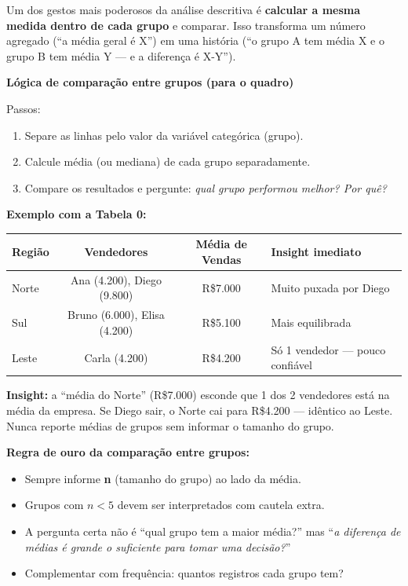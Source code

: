 Um dos gestos mais poderosos da análise descritiva é \textbf{calcular a mesma
medida dentro de cada grupo} e comparar. Isso transforma um número agregado
(``a média geral é X'') em uma história (``o grupo A tem média X e o grupo B
tem média Y — e a diferença é X-Y'').

\begin{BoardBox}
\textbf{Lógica de comparação entre grupos (para o quadro)}

Passos:
\begin{enumerate}
  \item Separe as linhas pelo valor da variável categórica (grupo).
  \item Calcule média (ou mediana) de cada grupo separadamente.
  \item Compare os resultados e pergunte: \emph{qual grupo performou melhor? Por quê?}
\end{enumerate}

\textbf{Exemplo com a Tabela 0:}
\begin{center}
\begin{tabular}{|l|c|c|l|}
\hline
\textbf{Região} & \textbf{Vendedores} & \textbf{Média de Vendas} & \textbf{Insight imediato} \\
\hline
Norte & Ana (4.200), Diego (9.800) & R\$7.000 & Muito puxada por Diego \\
Sul   & Bruno (6.000), Elisa (4.200) & R\$5.100 & Mais equilibrada \\
Leste & Carla (4.200) & R\$4.200 & Só 1 vendedor — pouco confiável \\
\hline
\end{tabular}
\end{center}

\textbf{Insight:} a ``média do Norte'' (R\$7.000) esconde que 1 dos 2
vendedores está na média da empresa. Se Diego sair, o Norte cai para R\$4.200
— idêntico ao Leste. Nunca reporte médias de grupos sem informar o\break
tamanho do grupo.
\end{BoardBox}

\begin{SolvedBox}
\textbf{Regra de ouro da comparação entre grupos:}
\begin{itemize}
  \item Sempre informe \textbf{n} (tamanho do grupo) ao lado da média.
  \item Grupos com $n < 5$ devem ser interpretados com cautela extra.
  \item A pergunta certa não é ``qual grupo tem a maior média?'' mas\break
  ``\emph{a diferença de médias é grande o suficiente para tomar uma decisão?}''
  \item Complementar com frequência: quantos registros cada grupo tem?
\end{itemize}
\end{SolvedBox}

